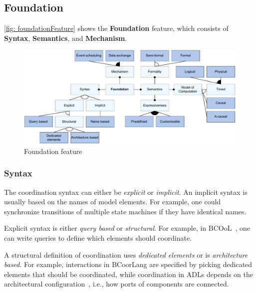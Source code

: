 \documentclass[runningheads]{llncs}
\begin{document}
\subsection{Foundation}

\autoref{fig: foundationFeature} shows the \textbf {Foundation} feature, which consists of \textbf{Syntax}, \textbf{Semantics}, and \textbf{Mechanism}.

\begin{figure}[ht]
	\centering
	\includegraphics[width=1\textwidth]{images/foundation_feature}
	\caption{Foundation feature}
	\label{fig: foundationFeature}
\end{figure}

\subsubsection{Syntax} The coordination syntax can either be \textit{explicit} or \textit{implicit}.
An implicit syntax is usually based on the names of model elements.
For example, one could synchronize transitions of multiple state machines if they have identical names.

Explicit syntax is either \textit{query based} or \textit{structural}.
For example, in BCOoL~\cite{varalarsenBCOolBehavioralCoordination2016,varalarsenBehavioralCoordinationOperator2015}, one can write queries to define which elements should coordinate.

A structural definition of coordination uses \textit{dedicated elements} or is \textit{architecture based}.
For example, interactions in BCoorLang are specified by picking dedicated elements that should be coordinated, while coordination in ADLs depends on the architectural configuration~\cite{medvidovicClassificationComparisonFramework2000}, i.e., how ports of components are connected.
\end{document}
